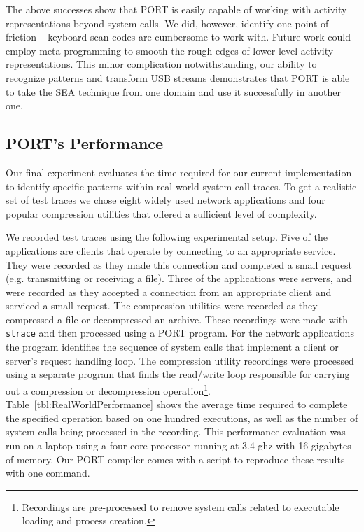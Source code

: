The above successes show that PORT is easily capable of working with activity representations beyond system calls.
We did, however, identify one point of friction -- keyboard scan codes are cumbersome to work with.
Future work could employ meta-programming to smooth the rough edges of lower level activity representations.
This minor complication notwithstanding,
our ability to recognize patterns and transform USB streams demonstrates
that PORT is able to take
the SEA technique from one domain and use it successfully in another one.


\subsection{PORT's Performance}

Our final experiment evaluates the
time required for our current implementation
to identify specific
patterns within real-world system call traces.
To get a realistic set of test traces
we chose
eight widely used network applications 
and four popular compression utilities that 
offered a sufficient level of complexity. 

We recorded test traces using the following 
experimental setup. Five of the applications are clients that operate by connecting to an appropriate service. They were recorded as they made this connection and completed a small request (e.g. transmitting or receiving a file).
Three of the applications were servers, and were recorded as they accepted a connection from an appropriate client and serviced a small request.
The compression utilities were recorded as they compressed a file or decompressed an archive.
These recordings were made with {\tt strace}
and then processed using a PORT program.
For the network applications the program
identifies the sequence of system calls that implement
a client or server's request handling loop.
The compression utility recordings were processed using a separate
program that finds the read/write loop responsible for
carrying out a compression or decompression operation\footnote{Recordings are pre-processed to remove system calls
related to executable loading and process creation.}.  Table~\ref{tbl:RealWorldPerformance}
shows the average time required to complete the specified operation
based on one hundred executions, as well as the number of system calls being processed in the recording.  This performance evaluation was run on a laptop using a four core processor running at 3.4 ghz with 16 gigabytes of memory.
Our PORT compiler comes with a script to reproduce these results with one command.

